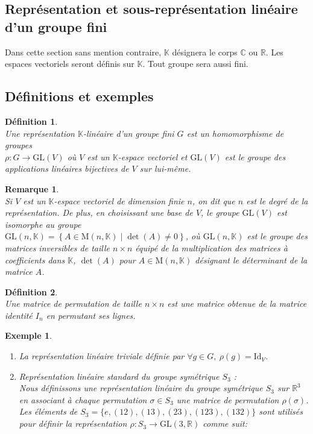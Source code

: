\documentclass[a4paper, 14pt]{report}
\newtheorem{definition}{Définition}[section]
\newtheorem{remark}{Remarque}[section]
\newtheorem{example}{Exemple}[section]
\begin{document}
\begin{onehalfspace}
{\section{Représentation et sous-représentation linéaire d'un groupe fini}
Dans cette section sans mention contraire, \(\mathbb{K}\) désignera le corps \(\mathbb{C}\) ou \(\mathbb{R}\). Les espaces vectoriels seront définis sur \(\mathbb{K}\). Tout groupe sera aussi fini.

\subsection{Définitions et exemples}
\begin{definition} \cite{serre1971representation} \\
Une représentation \(\mathbb{K}\)-linéaire d'un groupe fini \(G\) est un homomorphisme de groupes \\
\(\rho : G \rightarrow \mathrm{GL}(V)\) où  \(V\) est un \(\mathbb{K}\)-espace vectoriel et \(\mathrm{GL}(V)\) est le groupe des applications linéaires bijectives de \(V\) sur lui-même.
\end{definition}

\begin{remark} \cite{serre1971representation} \\
Si \(V\) est un \(\mathbb{K}\)-espace vectoriel de dimension finie \(n\), on dit que  \(n\) est le degré de la représentation. De plus, en choisissant une base  de \(V\), le groupe \(\mathrm{GL}(V)\) est isomorphe au groupe \\
\(\mathrm{GL}(n, \mathbb{K}) = \left\{ A \in \mathrm{M}(n, \mathbb{K}) \mid \det(A) \neq 0 \right\}\), où \(\mathrm{GL}(n, \mathbb{K})\) est le groupe des matrices inversibles de taille  \(n \times n\) équipé de la multiplication des matrices à coefficients dans \(\mathbb{K}\), $\det(A)$ pour $A \in \mathrm{M}(n, \mathbb{K})$ désignant le déterminant de la matrice $A$.	
\end{remark}

\begin{definition} \cite{cheung2018algebre}\\
Une matrice de permutation de taille \( n \times n \) est une matrice obtenue de la matrice identité \( I_n \) en permutant ses lignes.	
\end{definition}


\begin{example}\
	\begin{enumerate}
		\item La représentation linéaire triviale définie par \(\forall g \in G, \ \rho(g) = \mathrm{Id}_V\).
		\item Représentation linéaire standard du groupe symétrique \( S_3 \) :\\
		Nous définissons une représentation linéaire du groupe symétrique \( S_3 \) sur \( \mathbb{R}^3 \) en associant à chaque permutation \( \sigma \in S_3 \) une matrice de permutation \( \rho(\sigma) \). Les éléments de \( S_3 = \{e, (12), (13), (23), (123), (132)\} \) sont utilisés pour définir la représentation \( \rho : S_3 \to \mathrm{GL}(3, \mathbb{R}) \) comme suit:
		

\end{enumerate}
\end{example}}
\end{onehalfspace}
\end{document}
